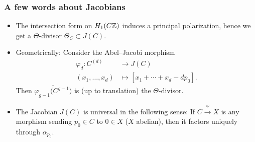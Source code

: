 \begin{frame}
\frametitle{A few words about Jacobians}

\begin{itemize}
	\item The intersection form on $H_1(C\mathbb{Z})$ induces a principal polarization, hence we get a \alert{$\Theta$-divisor} $\Theta_C \subset J(C)$.
	\item Geometrically: Consider the Abel--Jacobi morphism
	\begin{align*}
	\varphi_d\colon C^{(d)} &\to J(C) \\
	(x_1,\ldots,x_d) &\mapsto [x_1+\cdots+ x_d-dp_0].
	\end{align*}
	Then $\overline{\varphi_{g-1}\big(C^{g-1}\big)}$ is (up to translation) the $\Theta$-divisor. \pause
	\item The Jacobian $J(C)$ is universal in the following sense: If $C \xrightarrow{\varphi} X$ is any morphism sending $p_0 \in C$ to $0 \in X$ ($X$ abelian), then it factors uniquely through $\alpha_{p_0}$.
\end{itemize}
\end{frame}